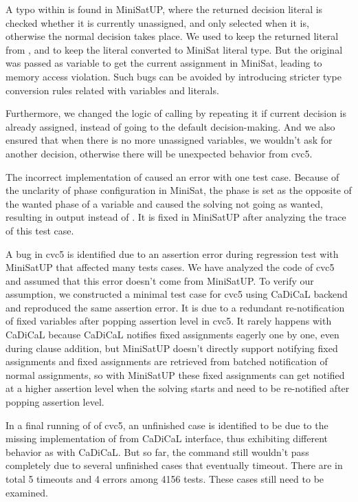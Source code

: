 A typo within  is found in MiniSatUP, where the returned decision literal is checked whether it is currently unassigned, and only selected when it is, otherwise the normal decision takes place. We used  to keep the returned literal from , and  to keep the literal converted to MiniSat literal type. But the original  was passed as variable to get the current assignment in MiniSat, leading to memory access violation. Such bugs can be avoided by introducing stricter type conversion rules related with variables and literals.

Furthermore, we changed the logic of calling  by repeating it if current decision is already assigned, instead of going to the default decision-making. And we also ensured that when there is no more unassigned variables, we wouldn't ask for another decision, otherwise there will be unexpected behavior from cvc5.

The incorrect implementation of  caused an error with one test case. Because of the unclarity of phase configuration in MiniSat, the phase is set as the opposite of the wanted phase of a variable and caused the solving not going as wanted, resulting in  output instead of . It is fixed in MiniSatUP after analyzing the trace of this test case.

A bug in cvc5 is identified due to an assertion error during regression test with MiniSatUP that affected many tests cases. We have analyzed the code of cvc5 and assumed that this error doesn't come from MiniSatUP. To verify our assumption, we constructed a minimal test case for cvc5 using CaDiCaL backend and reproduced the same assertion error. It is due to a redundant re-notification of fixed variables after popping assertion level in cvc5. It rarely happens with CaDiCaL because CaDiCaL notifies fixed assignments eagerly one by one, even during clause addition, but MiniSatUP doesn't directly support notifying fixed assignments and fixed assignments are retrieved from batched notification of normal assignments, so with MiniSatUP these fixed assignments can get notified at a higher assertion level when the solving starts and need to be re-notified after popping assertion level.

In a final running of  of cvc5, an unfinished case is identified to be due to the missing implementation of  from CaDiCaL interface, thus exhibiting different behavior as with CaDiCaL. But so far, the  command still wouldn't pass completely due to several unfinished cases that eventually timeout. There are in total 5 timeouts and 4 errors among 4156 tests. These cases still need to be examined.


